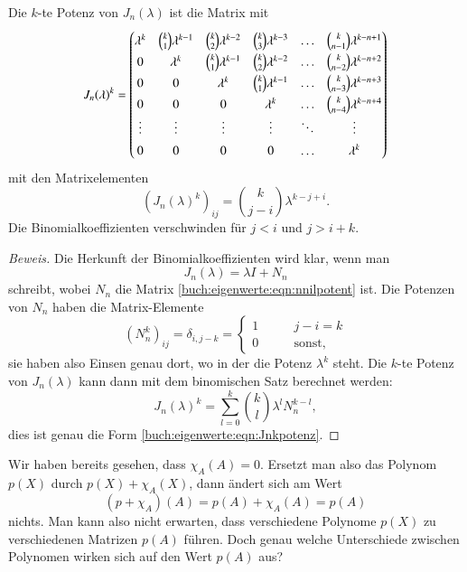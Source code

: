 \begin{satz}
Die $k$-te Potenz von $J_n(\lambda)$ ist die Matrix mit
\begin{equation}
J_n(\lambda)^k
=
\renewcommand{\arraystretch}{1.4}
\begin{pmatrix}
\lambda^k
	& \binom{k}{1}\lambda^{k-1}
		& \binom{k}{2} \lambda^{k-2}
			& \binom{k}{3} \lambda^{k-3}
				& \dots
					&\binom{k}{n-1}\lambda^{k-n+1}
\\
0
	& \lambda^k
		& \binom{k}{1}\lambda^{k-1}
			& \binom{k}{2} \lambda^{k-2}
				& \dots
					&\binom{k}{n-2}\lambda^{k-n+2}
\\
0
	& 0
		& \lambda^k
			& \binom{k}{1}\lambda^{k-1}
				& \dots
					&\binom{k}{n-3}\lambda^{k-n+3}
\\
0
	& 0
		& 0
			& \lambda^k
				& \dots
					&\binom{k}{n-4}\lambda^{k-n+4}
\\
\vdots  &\vdots &\vdots &\vdots &\ddots & \vdots
\\
0	& 0	& 0	& 0	& \dots	& \lambda^k
\end{pmatrix}
\label{buch:eigenwerte:eqn:Jnkpotenz}
\end{equation}
mit den Matrixelementen
\[
(J_n(\lambda)^k)_{i\!j}
=
\binom{k}{j-i}\lambda^{k-j+i}.
\]
Die Binomialkoeffizienten verschwinden für $j<i$ und $j>i+k$.
\end{satz}

\begin{proof}[Beweis]
Die Herkunft der Binomialkoeffizienten wird klar, wenn man
\[
J_n(\lambda) = \lambda I + N_n
\]
schreibt, wobei $N_n$ die Matrix \eqref{buch:eigenwerte:eqn:nnilpotent} ist.
Die Potenzen von $N_n$ haben die Matrix-Elemente
\[
(N_n^k)_{i\!j}
=
\delta_{i,j-k}
=
\begin{cases}
1&\qquad j-i=k\\
0&\qquad\text{sonst,}
\end{cases}
\]
sie haben also Einsen genau dort, wo in der
\label{buch:eigenwerte:eqn:Jnkpotenz} die Potenz $\lambda^{k}$ steht.
Die $k$-te Potenz von $J_n(\lambda)$ kann dann mit dem binomischen
Satz berechnet werden:
\[
J_n(\lambda)^k
=
\sum_{l=0}^k \binom{k}{l}\lambda^l N_n^{k-l},
\]
dies ist genau die Form \eqref{buch:eigenwerte:eqn:Jnkpotenz}.
\end{proof}

Wir haben bereits gesehen, dass $\chi_A(A)=0$.
Ersetzt man also das
Polynom $p(X)$ durch $p(X)+\chi_A(X)$, dann ändert sich am Wert 
\[
(p+\chi_A)(A)
=
p(A) + \chi_A(A)
=
p(A)
\]
nichts.
Man kann also nicht erwarten, dass verschiedene Polynome 
$p(X)$ zu verschiedenen Matrizen $p(A)$ führen.
Doch genau welche Unterschiede zwischen Polynomen wirken sich
auf den Wert $p(A)$ aus?

